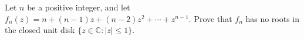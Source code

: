 Let $n$ be a positive integer, and let $f_n(z) = n + (n-1) z + (n-2)z^2 + \cdots + z^{n-1}$. Prove that
$f_n$ has no roots in the closed unit disk $\{z \in \mathbb{C}\colon |z| \leq 1 \}$.
